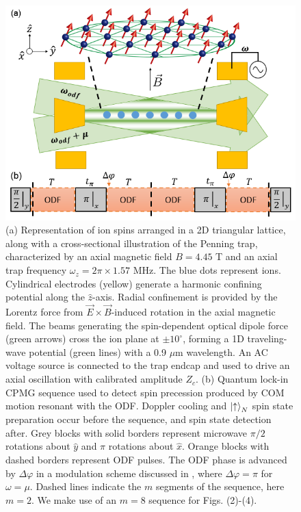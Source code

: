 \documentclass[aps,prl,twocolumn,superscriptaddress,floatfix]{revtex4-1}
\begin{document}
\begin{figure}
    \centering
    \includegraphics[width=\columnwidth]{expt}
    \caption{(a) Representation of ion spins arranged in a 2D triangular lattice, along with a cross-sectional illustration of the Penning trap, characterized by an axial magnetic field $B = 4.45$ T and an axial trap frequency $\omega_z = 2\pi \times 1.57$ MHz. The blue dots represent ions. Cylindrical electrodes (yellow) generate a harmonic confining potential along the $\hat{z}$-axis. Radial confinement is provided by the Lorentz force from $\vec{E} \times \vec{B}$-induced rotation in the axial magnetic field. The beams generating the spin-dependent optical dipole force (green arrows) cross the ion plane at $\pm 10^{\circ}$, forming a 1D traveling-wave potential (green lines) with a 0.9 $\mu$m wavelength. An AC voltage source is connected to the trap endcap and used to drive an axial oscillation with calibrated amplitude $Z_c$. (b) Quantum lock-in CPMG sequence used to detect spin precession produced by COM motion resonant with the ODF. Doppler cooling and $\ket{\uparrow}_N$ spin state preparation occur before the sequence, and spin state detection after. Grey blocks with solid borders represent microwave $\pi/2$ rotations about $\hat{y}$ and $\pi$ rotations about $\hat{x}$. Orange blocks with dashed borders represent ODF pulses. The ODF phase is advanced by $\Delta\varphi$ in a modulation scheme discussed in \citep{SuppMat}, where $\Delta\varphi = \pi$ for $\omega = \mu$. Dashed lines indicate the $m$ segments of the sequence, here $m = 2$. We make use of an $m = 8$ sequence for Figs. (2)-(4).} 
    \label{Expt}
\end{figure}
\end{document}
